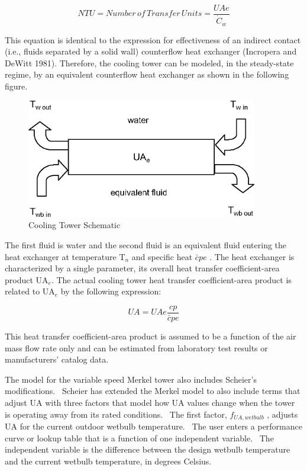 \begin{equation}
NTU = Number\,of\,Transfer\,Units = \frac{{UAe}}{{{{\dot C}_w}}}
\end{equation}

This equation is identical to the expression for effectiveness of an indirect contact (i.e., fluids separated by a solid wall) counterflow heat exchanger (Incropera and DeWitt 1981). Therefore, the cooling tower can be modeled, in the steady-state regime, by an equivalent counterflow heat exchanger as shown in the following figure.

\begin{figure}[hbtp] %
\centering
\includegraphics[width=0.9\textwidth, height=0.9\textheight, keepaspectratio=true]{media/image4542.png}
\caption{Cooling Tower Schematic \protect \label{fig:cooling-tower-schematic}}
\end{figure}

The first fluid is water and the second fluid is an equivalent fluid entering the heat exchanger at temperature T\(_{n}\) and specific heat \(\bar cpe\) . The heat exchanger is characterized by a single parameter, its overall heat transfer coefficient-area product UA\(_{e}\). The actual cooling tower heat transfer coefficient-area product is related to UA\(_{e}\) by the following expression:

\begin{equation}
UA = UAe\frac{{cp}}{{\bar cpe}}
\end{equation}

This heat transfer coefficient-area product is assumed to be a function of the air mass flow rate only and can be estimated from laboratory test results or manufacturers' catalog data.

The model for the variable speed Merkel tower also includes Scheier's modifications.~ Scheier has extended the Merkel model to also include terms that adjust UA with three factors that model how UA values change when the tower is operating away from its rated conditions.~ The first factor, \({f_{UA,wetbulb}}\) , adjusts UA for the current outdoor wetbulb temperature.~ The user enters a performance curve or lookup table that is a function of one independent variable.~ The independent variable is the difference between the design wetbulb temperature and the current wetbulb temperature, in degrees Celsius.

